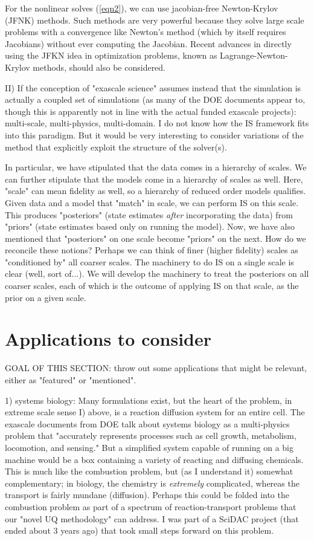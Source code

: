\documentclass[11pt]{article}
\begin{document}
For the nonlinear solves (\ref{eqn2}), 
we can use jacobian-free Newton-Krylov (JFNK) methods. Such methods are very powerful because they solve large scale
problems with a convergence like Newton's method (which by itself requires Jacobians) without ever computing the Jacobian.  Recent advances
in directly using the JFKN idea in optimization problems, known as Lagrange-Newton-Krylov methods, should also be considered.


II) If the conception of "exascale science" assumes instead that the simulation is 
actually a coupled set of simulations (as many of the DOE documents appear to, though this is apparently not in line with
the actual funded exascale projects): multi-scale, multi-physics, multi-domain.
I do not know how the IS framework fits into this paradigm.  But it would be very interesting to consider variations of the method
that explicitly exploit the structure of the solver(s).  

In particular, we have stipulated that the data comes in a hierarchy of 
scales.  We can further stipulate that the models come in a hierarchy of scales as well.  Here, "scale" can mean fidelity as well, so a hierarchy
of reduced order models qualifies.  Given data and a model that "match" in scale, we can perform IS on this scale.  This produces
"posteriors" (state estimates \emph{after} incorporating the data) from "priors" (state estimates based only on running the model).
Now, we have also mentioned that "posteriors" on one scale become "priors" on the next.  How do we reconcile these notions?  Perhaps we can 
think of finer (higher fidelity) scales as "conditioned by" all coarser scales.  The machinery to do IS on a single scale is clear (well, sort of...).
We will develop the machinery to treat the posteriors on all coarser scales, each of which is the outcome of applying IS on
that scale, as the prior on a given scale.  



\section{Applications to consider}
GOAL OF THIS SECTION: throw out some applications that might be relevant, either as "featured" or "mentioned".

1) systems biology:  Many formulations exist, but the heart of the problem, in extreme scale sense I) above, is a reaction diffusion system for an
entire cell.  The exascale documents from DOE talk about systems biology as a multi-physics problem that "accurately
represents processes such as cell growth, metabolism, locomotion, and sensing."  But a simplified system capable of running on a big machine
would be a box containing a variety of reacting and diffusing chemicals.  This is much like the combustion problem, but (as I understand it) 
somewhat complementary; in biology, the chemistry is \emph{extremely} complicated, whereas the transport is fairly mundane (diffusion).  Perhaps this
could be folded into the combustion problem as part of a spectrum of reaction-transport problems that our "novel UQ methodology" can address.  I 
was part of a SciDAC project (that ended about 3 years ago) that took small steps forward on this problem.
\end{document}
